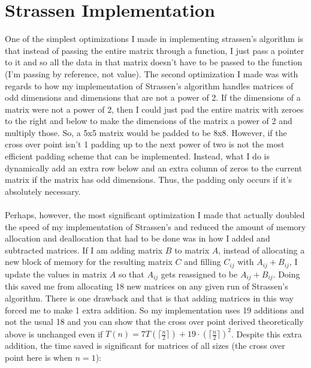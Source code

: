 \documentclass{article}
\begin{document}
\section{Strassen Implementation}
One of the simplest optimizations I made in implementing strassen's algorithm is that instead of passing the entire matrix through a function, I just pass a pointer to it and so all the data in that matrix doesn't have to be passed to the function (I'm passing by reference, not value).  The second optimization I made was with regards to how my implementation of Strassen's algorithm handles matrices of odd dimensions and dimensions that are not a power of 2.  If the dimensions of a matrix were not a power of 2, then I could just pad the entire matrix with zeroes to the right and below to make the dimensions of the matrix a power of 2 and multiply those.  So, a 5x5 matrix would be padded to be 8x8. However, if the cross over point isn't 1 padding up to the next power of two is not the most efficient padding scheme that can be implemented.  Instead, what I do is dynamically add an extra row below and an extra column of zeros to the current matrix if the matrix has odd dimensions.  Thus, the padding only occurs if it's absolutely necessary. \\\\
\noindent
Perhaps, however, the most significant optimization I made that actually doubled the speed of my implementation of Strassen's and reduced the amount of memory allocation and deallocation that had to be done was in how I added and subtracted matrices.  If I am adding matrix $B$ to matrix $A$, instead of allocating a new block of memory for the resulting matrix $C$ and filling $C_{ij}$ with $A_{ij} + B_{ij}$, I update the values in matrix $A$ so that $A_{ij}$ gets reassigned to be $A_{ij}+B_{ij}$. Doing this saved me from allocating 18 new matrices on any given run of Strassen's algorithm.  There is one drawback and that is that adding matrices in this way forced me to make 1 extra addition. So my implementation uses 19 additions and not the usual 18 and you can show that the cross over point derived theoretically above is unchanged even if $T(n) = 7T(\lceil \frac{n}{2} \rceil) + 19\cdot(\lceil \frac{n}{2} \rceil)^2$.  Despite this extra addition, the time saved is significant for matrices of all sizes (the cross over point here is when $n = 1$): \\ 
\end{document}
